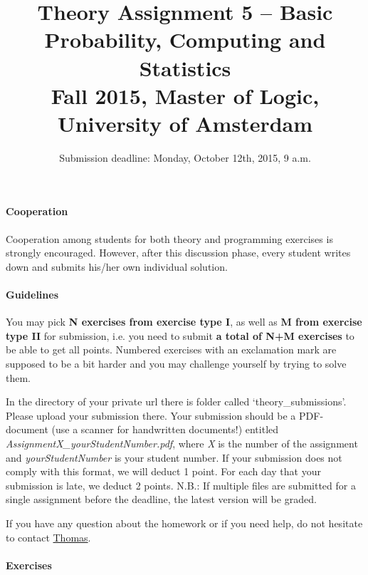 \documentclass{article}
\title{Theory Assignment 5 -- Basic Probability, Computing and Statistics\\[2mm]
\large{Fall 2015, Master of Logic, University of Amsterdam}}
\author{}
\date{Submission deadline: Monday, October 12th, 2015, 9 a.m.}
\begin{document}
\maketitle

\paragraph{Cooperation}
Cooperation among students for both theory and programming exercises
is strongly encouraged.  However, after this discussion phase, every student writes down and submits his/her own individual solution.

\paragraph{Guidelines}
You may pick {\bf N exercises from exercise type I}, as well as {\bf M from exercise type II} for submission, i.e. you need to submit {\bf a total of N+M exercises} to be able to get all points. Numbered exercises with an exclamation mark are supposed to be a bit harder and you may challenge yourself by trying to solve them.

In the directory of your private url there is folder called `theory\_submissions'. Please upload your submission there. Your submission should be a PDF-document (use a scanner for handwritten documents!) entitled \textit{AssignmentX\_yourStudentNumber.pdf}, where \textit{X} is the number of the assignment and \textit{yourStudentNumber} is your student number. If your submission does not comply with this format, we will deduct 1 point. For each day that your submission is late, we deduct 2 points. N.B.: If multiple files are submitted for a single assignment before the deadline, the latest version will be graded.

If you have any question about the homework or if you need help, do not hesitate to contact \href{mailto:T.S.Brochhagen@uva.nl}{Thomas}.

\paragraph{Exercises}
\end{document}
